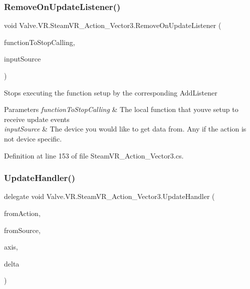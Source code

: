 \subsubsection{\texorpdfstring{RemoveOnUpdateListener()}{RemoveOnUpdateListener()}}
{\footnotesize\ttfamily void Valve.\+V\+R.\+Steam\+V\+R\+\_\+\+Action\+\_\+\+Vector3.\+Remove\+On\+Update\+Listener (\begin{DoxyParamCaption}\item[{\mbox{\hyperlink{class_valve_1_1_v_r_1_1_steam_v_r___action___vector3_a99c0524f104c6d8c94a0e874b0ecc813}{Update\+Handler}}}]{function\+To\+Stop\+Calling,  }\item[{\mbox{\hyperlink{namespace_valve_1_1_v_r_a82e5bf501cc3aa155444ee3f0662853f}{Steam\+V\+R\+\_\+\+Input\+\_\+\+Sources}}}]{input\+Source }\end{DoxyParamCaption})}



Stops executing the function setup by the corresponding Add\+Listener 


\begin{DoxyParams}{Parameters}
{\em function\+To\+Stop\+Calling} & The local function that you\textquotesingle{}ve setup to receive update events\\
\hline
{\em input\+Source} & The device you would like to get data from. Any if the action is not device specific.\\
\hline
\end{DoxyParams}


Definition at line 153 of file Steam\+V\+R\+\_\+\+Action\+\_\+\+Vector3.\+cs.

\mbox{\label{class_valve_1_1_v_r_1_1_steam_v_r___action___vector3_a99c0524f104c6d8c94a0e874b0ecc813}} 
\subsubsection{\texorpdfstring{UpdateHandler()}{UpdateHandler()}}
{\footnotesize\ttfamily delegate void Valve.\+V\+R.\+Steam\+V\+R\+\_\+\+Action\+\_\+\+Vector3.\+Update\+Handler (\begin{DoxyParamCaption}\item[{\mbox{\hyperlink{class_valve_1_1_v_r_1_1_steam_v_r___action___vector3}{Steam\+V\+R\+\_\+\+Action\+\_\+\+Vector3}}}]{from\+Action,  }\item[{\mbox{\hyperlink{namespace_valve_1_1_v_r_a82e5bf501cc3aa155444ee3f0662853f}{Steam\+V\+R\+\_\+\+Input\+\_\+\+Sources}}}]{from\+Source,  }\item[{Vector3}]{axis,  }\item[{Vector3}]{delta }\end{DoxyParamCaption})}



